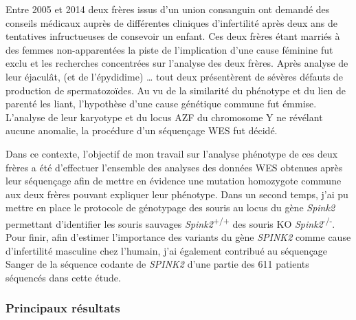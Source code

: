 \documentclass[12pt,twoside]{reedthesis}
\theoremstyle{definition}
\theoremstyle{definition}
\theoremstyle{remark}
\begin{document}
  Entre 2005 et 2014 deux frères issus d'un union consanguin ont demandé
  des conseils médicaux auprès de différentes cliniques d'infertilité
  après deux ans de tentatives infructueuses de consevoir un enfant. Ces
  deux frères étant marriés à des femmes non-apparentées la piste de
  l'implication d'une cause féminine fut exclu et les recherches
  concentrées sur l'analyse des deux frères. Après analyse de leur
  éjaculât, (et de l'épydidime) \ldots{} tout deux présentèrent de sévères
  défauts de production de spermatozoïdes. Au vu de la similarité du
  phénotype et du lien de parenté les liant, l'hypothèse d'une cause
  génétique commune fut émmise. L'analyse de leur karyotype et du locus
  AZF du chromosome Y ne révélant aucune anomalie, la procédure d'un
  séquençage WES fut décidé.
  
  Dans ce contexte, l'objectif de mon travail sur l'analyse phénotype de
  ces deux frères a été d'effectuer l'ensemble des analyses des données
  WES obtenues après leur séquençage afin de mettre en évidence une
  mutation homozygote commune aux deux frères pouvant expliquer leur
  phénotype. Dans un second temps, j'ai pu mettre en place le protocole de
  génotypage des souris au locus du gène \emph{Spink2} permettant
  d'identifier les souris sauvages \emph{Spink2}\textsuperscript{+/+} des
  souris KO \emph{Spink2}\textsuperscript{-/-}. Pour finir, afin d'estimer
  l'importance des variants du gène \emph{SPINK2} comme cause
  d'infertilité masculine chez l'humain, j'ai également contribué au
  séquençage Sanger de la séquence codante de \emph{SPINK2} d'une partie
  des 611 patients séquencés dans cette étude.
  
  \newpage
  
  
  
  \newpage
  
  \subsubsection{Principaux résultats}\label{principaux-resultats}
  
\end{document}

